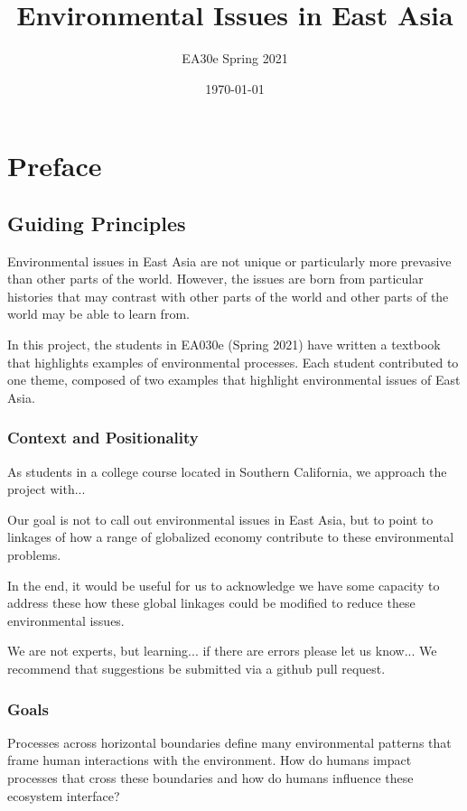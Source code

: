 \documentclass{book}\usepackage{knitr}
\title{Environmental Issues in East Asia}
\author{EA30e Spring 2021}
\date{\today}
\begin{document}
\maketitle
\makeglossaries

\frontmatter
\tableofcontents


\chapter*{Preface}

\section{Guiding Principles}

Environmental issues in East Asia are not unique or particularly more prevasive than other parts of the world. However, the issues are born from particular histories that may contrast with other parts of the world and other parts of the world may be able to learn from. 

In this project, the students in EA030e (Spring 2021) have written a textbook that highlights examples of environmental processes. Each student contributed to one theme, composed of two examples that highlight environmental issues of East Asia. 

\subsection{Context and Positionality}

As students in a college course located in Southern California, we approach the project with...


Our goal is not to call out environmental issues in East Asia, but to point to linkages of how a range of globalized economy contribute to these environmental problems. 

In the end, it would be useful for us to acknowledge we have some capacity to address these how these global linkages could be modified to reduce these environmental issues.

We are not experts, but learning... if there are errors please let us know... We recommend that suggestions be submitted via a github pull request.

\subsection{Goals}

Processes across horizontal boundaries define many environmental patterns that frame human interactions with the environment. How do humans impact processes that cross these boundaries and how do humans influence these ecosystem interface?
\end{document}
